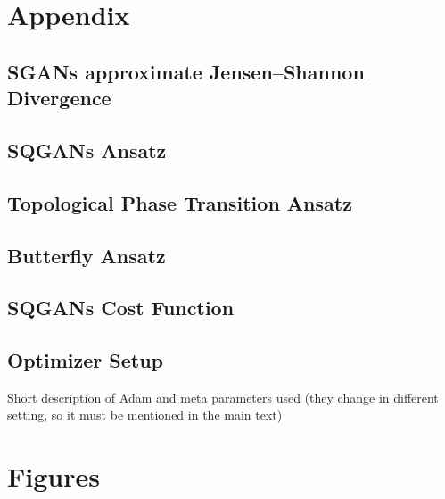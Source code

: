 \chapter{Appendix}

\section{SGANs approximate Jensen–Shannon Divergence}
\label{apx:JSD}




\section{SQGANs Ansatz}
\label{apx:sqgans_ansatz}


\section{Topological Phase Transition Ansatz}
\label{apx:topological_phase_transition_ansatz}

\section{Butterfly Ansatz}
\label{apx:butterfly_ansatz}

\section{SQGANs Cost Function}
\label{apx:sqgans_cost_function}

\section{Optimizer Setup}
\label{apx:optimizer_setup}
Short description of Adam and meta parameters used (they change in different
setting, so it must be mentioned in the main text)
\chapter{Figures}
